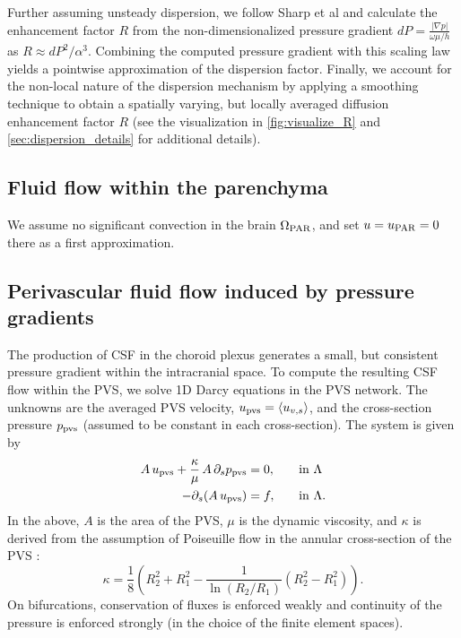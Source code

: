 \documentclass[fleqn,10pt]{wlscirep}
\begin{document}
Further assuming unsteady dispersion, we follow Sharp et al \cite{keith2019dispersion} and calculate the enhancement factor $R$ from the non-dimensionalized pressure gradient $dP=\frac{|\nabla p|}{\omega \mu / h}$ as $R\approx dP^2 / \alpha^3$. Combining the computed pressure gradient with this scaling law yields a pointwise approximation of the dispersion factor. Finally, we account for the non-local nature of the dispersion mechanism by applying a smoothing technique to obtain a spatially varying, but locally averaged diffusion enhancement factor $R$ (see the visualization in \cref{fig:visualize_R} and \cref{sec:dispersion_details} for additional details).


\subsection*{Fluid flow within the parenchyma}
\label{sec:csf_brain}

We assume no significant convection in the brain $\Omega_{\rm PAR}$, and set $u = u_{\rm PAR} = 0$ there as a first approximation. 

\subsection*{Perivascular fluid flow induced by pressure gradients}

The production of CSF in the choroid plexus generates a small, but consistent pressure gradient within the intracranial space. To compute the resulting CSF flow within the PVS, we solve 1D Darcy equations in the PVS network. The unknowns are the averaged PVS velocity, $u_{\rm pvs} = \langle u_{v,s} \rangle$, and the cross-section pressure $p_{\rm pvs} $ (assumed to be constant in each cross-section). The system is given by  \cite{daversin2022geometrically, gjerde2024directional} 
\begin{alignat}{2}
A \,  u_{\rm pvs}   + \frac{\kappa}{\mu} \, A \, \partial_{s} p_{\rm pvs} & = 0, &&  \quad \rm in  \,\, \Lambda  \\ 
-\partial_s (A \, u_{\rm pvs}) & = f, && \quad \rm in  \,\, \Lambda .  
\end{alignat} 
In the above, $A$ is the area of the PVS, $\mu$ is the dynamic viscosity, and $\kappa$ is derived from the assumption of Poiseuille
flow in the annular cross-section of the PVS \cite{daversin2022geometrically,tithof2022network}: 
\begin{equation}
\kappa = \frac18 \left( R_2^2 + R_1^2 - \frac{1}{\ln(R_2/R_1)} (R_2^2- R_1^2) \right). 
\end{equation}
On bifurcations, conservation of fluxes is enforced weakly and continuity of the pressure is enforced strongly (in the choice of the finite element spaces). 
\end{document}
